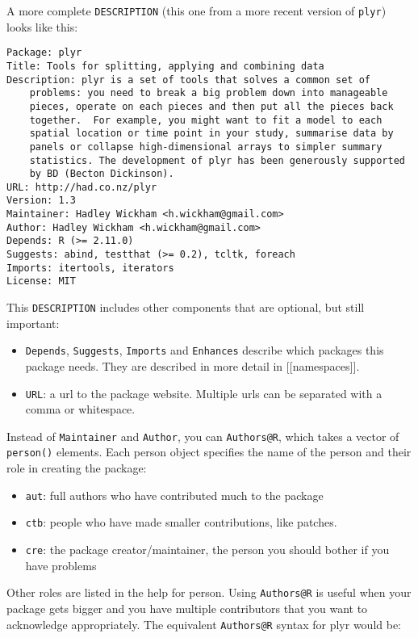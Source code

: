 A more complete \texttt{DESCRIPTION} (this one from a more recent
version of \texttt{plyr}) looks like this:

\begin{verbatim}
Package: plyr
Title: Tools for splitting, applying and combining data
Description: plyr is a set of tools that solves a common set of
    problems: you need to break a big problem down into manageable
    pieces, operate on each pieces and then put all the pieces back
    together.  For example, you might want to fit a model to each
    spatial location or time point in your study, summarise data by
    panels or collapse high-dimensional arrays to simpler summary
    statistics. The development of plyr has been generously supported
    by BD (Becton Dickinson).
URL: http://had.co.nz/plyr
Version: 1.3
Maintainer: Hadley Wickham <h.wickham@gmail.com>
Author: Hadley Wickham <h.wickham@gmail.com>
Depends: R (>= 2.11.0)
Suggests: abind, testthat (>= 0.2), tcltk, foreach
Imports: itertools, iterators
License: MIT
\end{verbatim}

This \texttt{DESCRIPTION} includes other components that are optional,
but still important:

\begin{itemize}
\item
  \texttt{Depends}, \texttt{Suggests}, \texttt{Imports} and
  \texttt{Enhances} describe which packages this package needs. They are
  described in more detail in {[}{[}namespaces{]}{]}.
\item
  \texttt{URL}: a url to the package website. Multiple urls can be
  separated with a comma or whitespace.
\end{itemize}

Instead of \texttt{Maintainer} and \texttt{Author}, you can
\texttt{Authors@R}, which takes a vector of \texttt{person()} elements.
Each person object specifies the name of the person and their role in
creating the package:

\begin{itemize}
\item
  \texttt{aut}: full authors who have contributed much to the package
\item
  \texttt{ctb}: people who have made smaller contributions, like
  patches.
\item
  \texttt{cre}: the package creator/maintainer, the person you should
  bother if you have problems
\end{itemize}

Other roles are listed in the help for person. Using \texttt{Authors@R}
is useful when your package gets bigger and you have multiple
contributors that you want to acknowledge appropriately. The equivalent
\texttt{Authors@R} syntax for plyr would be:

